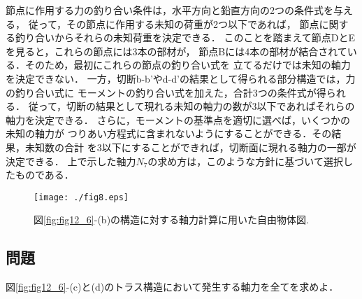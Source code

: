 \documentclass[10pt,a4j]{jarticle}
\begin{document}
節点に作用する力の釣り合い条件は，水平方向と鉛直方向の2つの条件式を与える，
従って，その節点に作用する未知の荷重が2つ以下であれば，
節点に関する釣り合いからそれらの未知荷重を決定できる．
このことを踏まえて節点DとEを見ると，これらの節点には3本の部材が，
節点Bには4本の部材が結合されている．そのため，最初にこれらの節点の釣り合い式を
立てるだけでは未知の軸力を決定できない．
一方，切断b-b'やd-d'の結果として得られる部分構造では，力の釣り合い式に
モーメントの釣り合い式を加えた，合計3つの条件式が得られる．
従って，切断の結果として現れる未知の軸力の数が3以下であればそれらの軸力を決定できる．
さらに，モーメントの基準点を適切に選べば，いくつかの未知の軸力が
つりあい方程式に含まれないようにすることができる．その結果，未知数の合計
を3以下にすることができれば，切断面に現れる軸力の一部が決定できる．
上で示した軸力$N_7$の求め方は，このような方針に基づいて選択したものである．
\begin{figure}[h]
	\begin{center}
	\texttt{[image: ./fig8.eps]} 
	\end{center}
	\caption{
	図\ref{fig:fig12_6}-(b)の構造に対する軸力計算に用いた自由物体図.
	} 
	\label{fig:fig12_8}
\end{figure}
\subsection{問題}
図\ref{fig:fig12_6}-(c)と(d)のトラス構造において発生する軸力を全てを求めよ．
\end{document}
